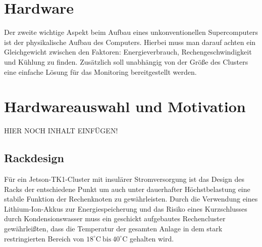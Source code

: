 \section{Hardware}
Der zweite wichtige Aspekt beim Aufbau eines unkonventionellen 
Supercomputers ist der physikalische Aufbau des Computers.
Hierbei muss man darauf achten ein Gleichgewicht zwischen den Faktoren: 
Energieverbrauch, Rechengeschwindigkeit und Kühlung zu finden.
Zusätzlich soll unabhängig von der Größe des Clusters eine
einfache Lösung für das Monitoring bereitgestellt werden.

\section{Hardwareauswahl und Motivation}
HIER NOCH INHALT EINFÜGEN!


\subsection{Rackdesign}
Für ein Jetson-TK1-Cluster mit insulärer Stromversorgung
ist das Design des Racks der entschiedene Punkt um 
auch unter dauerhafter Höchstbelastung eine
stabile Funktion der Rechenknoten zu gewährleisten.
Durch die Verwendung eines Lithium-Ion-Akkus zur Energiespeicherung
und das Risiko eines Kurzschlusses durch Kondensionswasser muss
ein geschickt aufgebautes Rechencluster gewährleißten, dass die Temperatur
der gesamten Anlage in dem stark restringierten Bereich von 
$18^\circ\text{C}~\text{bis}~40^\circ \text{C}$ gehalten wird. 
